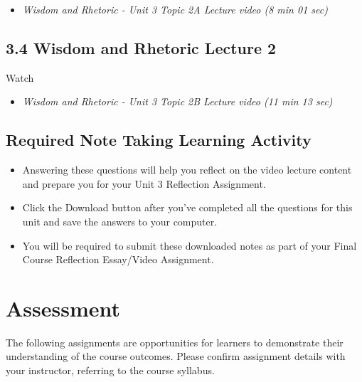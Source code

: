 \documentclass[
]{book}
\providecommand{\tightlist}{%
  \setlength{\itemsep}{0pt}\setlength{\parskip}{0pt}}
\begin{document}
\begin{itemize}
\tightlist
\item
  \emph{Wisdom and Rhetoric - Unit 3 Topic 2A Lecture video (8 min 01 sec)}
\end{itemize}

\hypertarget{wisdom-and-rhetoric-lecture-2}{%
\section*{3.4 Wisdom and Rhetoric Lecture 2}\label{wisdom-and-rhetoric-lecture-2}}

Watch

\begin{itemize}
\tightlist
\item
  \emph{Wisdom and Rhetoric - Unit 3 Topic 2B Lecture video (11 min 13 sec)}
\end{itemize}

\hypertarget{required-note-taking-learning-activity-2}{%
\section*{Required Note Taking Learning Activity}\label{required-note-taking-learning-activity-2}}

\begin{itemize}
\tightlist
\item
  Answering these questions will help you reflect on the video lecture content and prepare you for your Unit 3 Reflection Assignment.
\item
  Click the Download button after you've completed all the questions for this unit and save the answers to your computer.
\item
  You will be required to submit these downloaded notes as part of your Final Course Reflection Essay/Video Assignment.
\end{itemize}

\hypertarget{assessment}{%
\chapter*{Assessment}\label{assessment}}

The following assignments are opportunities for learners to demonstrate their understanding of the course outcomes. Please confirm assignment details with your instructor, referring to the course syllabus.
\end{document}
